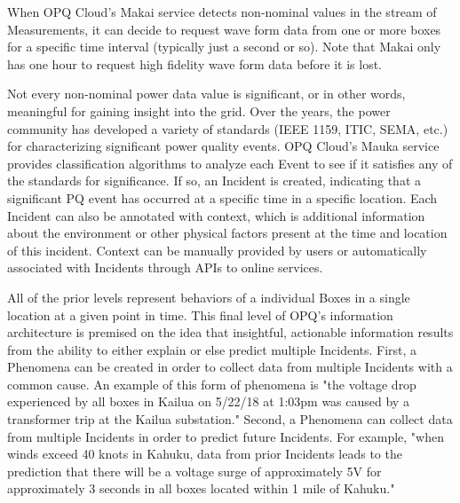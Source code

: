 When OPQ Cloud's Makai service detects non-nominal values in the stream of Measurements, it can decide to request wave form data from one or more boxes for a specific time interval (typically just a second or so). Note that Makai only has one hour to request high fidelity wave form data before it is lost.

Not every non-nominal power data value is significant, or in other words, meaningful for gaining insight into the grid. Over the years, the power community has developed a variety of standards (IEEE 1159, ITIC, SEMA, etc.) for characterizing significant power quality events. OPQ Cloud's Mauka service provides classification algorithms to analyze each Event to see if it satisfies any of the standards for significance. If so, an Incident is created, indicating that a significant PQ event has occurred at a specific time in a specific location. Each Incident can also be annotated with context, which is additional information about the environment or other physical factors present at the time and location of this incident. Context can be manually provided by users or automatically associated with Incidents through APIs to online services.

All of the prior levels represent behaviors of a individual Boxes in a single location at a given point in time. This final level of OPQ's information architecture is premised on the idea that insightful, actionable information results from the ability to either explain or else predict multiple Incidents. First, a Phenomena can be created in order to collect data from multiple Incidents with a common cause. An example of this form of phenomena is "the voltage drop experienced by all boxes in Kailua on 5/22/18 at 1:03pm was caused by a transformer trip at the Kailua substation." Second, a Phenomena can collect data from multiple Incidents in order to predict future Incidents. For example, "when winds exceed 40 knots in Kahuku, data from prior Incidents leads to the prediction that there will be a voltage surge of approximately 5V for approximately 3 seconds in all boxes located within 1 mile of Kahuku."




